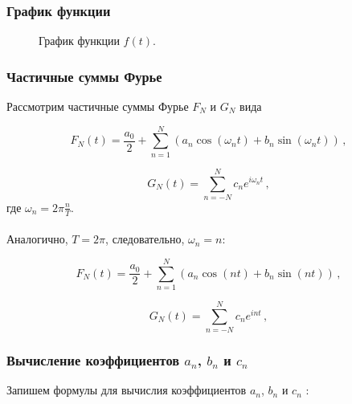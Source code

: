 \documentclass[a5paper, 10pt]{article}
\theoremstyle{definition}
\theoremstyle{plain}
\theoremstyle{remark}
\begin{document}
\subsubsection{График функции}
\begin{figure}[h]
\caption{График функции $f(t)$.}
\end{figure}

\subsubsection{Частичные суммы Фурье}
Рассмотрим частичные суммы Фурье $F_N$ и $G_N$ вида

\begin{equation}
F_N(t) = \frac{a_0}{2} + \sum  \limits_{n=1}^N \left( a_n \cos \left( \omega_n t \right) + b_n \sin \left( \omega_n t \right)  \right) \, ,
\end{equation}

\begin{equation}
G_N (t) = \sum  \limits_{n=-N}^N c_n e^{i \omega_n t} \, ,
\end{equation}
где $\omega_n = 2 \pi \frac{n}{T}$.\\
\\
Аналогично, $T = 2 \pi$, следовательно, $\omega_n = n$:

\begin{equation}
F_N(t) = \frac{a_0}{2} + \sum  \limits_{n=1}^N \left( a_n \cos \left( n t \right) + b_n \sin \left( n t \right)  \right) \, ,
\end{equation}

\begin{equation}
G_N (t) = \sum  \limits_{n=-N}^N c_n e^{i n t} \, ,
\end{equation}

\subsubsection{Вычисление коэффициентов $a_n$, $b_n$ и $c_n$}
Запишем формулы для вычислия коэффициентов $a_n$, $b_n$ и $c_n$ :
\end{document}
